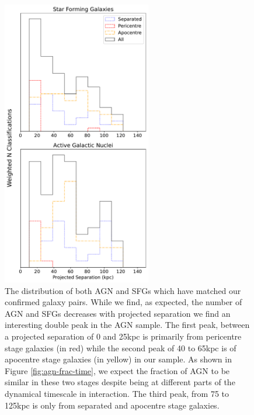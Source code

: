 \begin{figure}
\centering
\includegraphics[width=0.58\textwidth]{Chapter3/figures/sfg-agn-dist.pdf}
\caption[The distribution of both AGN and SFGs which have been matched our confirmed galaxy pairs.]{The distribution of both AGN and SFGs which have matched our confirmed galaxy pairs. While we find, as expected, the number of AGN and SFGs decreases with projected separation we find an interesting double peak in the AGN sample. The first peak, between a projected separation of 0 and 25kpc is primarily from pericentre stage galaxies (in red) while the second peak of 40 to 65kpc is of apocentre stage galaxies (in yellow) in our sample. As shown in Figure \ref{fig:agn-frac-time}, we expect the fraction of AGN to be similar in these two stages despite being at different parts of the dynamical timescale in interaction. The third peak, from 75 to 125kpc is only from separated and apocentre stage galaxies.}
\label{fig:sfg-agn-proj}
\end{figure}

